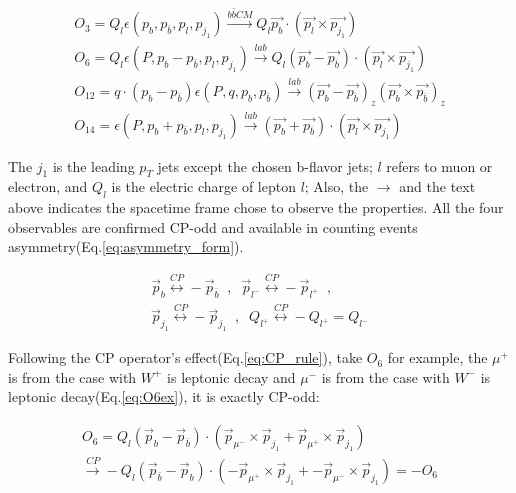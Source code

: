 		\begin{equation}
		\begin{split}
		O_3 = Q_l \epsilon(p_{b}, p_{\bar{b}}, p_{l}, p_{j_1}) \xrightarrow[\text{}]{b \bar{b} CM} Q_l \vec{p_{b}} \cdot ( \vec{p_l} \times \vec{p_{j_1}} ) \\
		O_{6} = Q_l \epsilon(P, p_{b}-p_{\bar{b}}, p_{l}, p_{j_1}) \xrightarrow[\text{}]{lab} Q_l (\vec{p_{b}} - \vec{p_{\overline{b}}}) \cdot ( \vec{p_l} \times \vec{p_{j_1}} ) \\
		O_{12} = q \cdot (p_{b}-p_{\bar{b}}) \epsilon(P_{}, q, p_{b}, p_{\bar{b}}) \xrightarrow[]{lab} (\vec{p_{b}} - \vec{p_{\overline{b}}})_z ( \vec{p_b} \times \vec{p_{\overline{b}}} )_z \\
		O_{14} = \epsilon(P, p_{b}+p_{\bar{b}}, p_{l}, p_{j_1}) \xrightarrow[]{lab} (\vec{p_{b}} + \vec{p_{\overline{b}}}) \cdot ( \vec{p_l} \times \vec{p_{j_1}} )
		\end{split}
		\label{eq:four_obs}
		\end{equation}
		\FloatBarrier

		The $j_1$ is the leading $p_T$ jets except the chosen b-flavor jets; $l$ refers to muon or electron, and $Q_l$ is the electric charge of lepton $l$; Also, the $\rightarrow$ and the text above indicates the spacetime frame chose to observe the properties. All the four observables are confirmed CP-odd and available in counting events asymmetry(Eq.\ref{eq:asymmetry_form}). 

		\begin{equation}
		\begin{split}
		\vec{p}_b \overset{CP}{\longleftrightarrow} -\vec{p}_{\overline{b}}\;\;, \;\; \vec{p}_{l^-} \overset{CP}{\longleftrightarrow} -\vec{p}_{l^+}\;\;,\;\;\;\;\;\; \\
		\vec{p}_{j_1} \overset{CP}{\longleftrightarrow} -\vec{p}_{j_1}\;\;, \;\; Q_{l^+} \overset{CP}{\longleftrightarrow} -Q_{l^+} = Q_{l^-}
		\label{eq:CP_rule}
		\end{split}
		\end{equation}
		\FloatBarrier

		Following the CP operator's effect(Eq.\ref{eq:CP_rule}), take $O_6$ for example, the $\mu^+$ is from the case with $W^+$ is leptonic decay and $\mu^-$ is from the case with $W^-$ is leptonic decay(Eq.\ref{eq:O6ex}), it is exactly CP-odd:

		\begin{equation}
		\begin{split}
		O_6 = Q_l (\vec{p}_b - \vec{p}_{\bar{b}}) \cdot (\vec{p}_{\mu^-} \times \vec{p}_{j_1} + \vec{p}_{\mu^+} \times \vec{p}_{j_1}) \\
		\xrightarrow[]{CP} -Q_l (\vec{p}_{\bar{b}} - \vec{p}_b) \cdot (-\vec{p}_{\mu^+} \times \vec{p}_{j_1} + -\vec{p}_{\mu^-} \times \vec{p}_{j_1}) = -O_6
		\label{eq:O6ex}
		\end{split}
		\end{equation}
		\FloatBarrier


